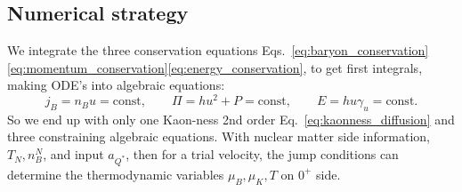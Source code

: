 \documentclass[11pt]{article}
\newcommand{\mgacom}[1]{\textsf{\color[rgb]{0.75,0,0}[\textsuperscript{MGA} #1]}}
\newcommand{\JScom}[1]{\textsf{\color{violet} [\textsuperscript{JS}#1]}}
\begin{document}
\subsection{Numerical strategy}

We integrate the three conservation equations Eqs.~\eqref{eq:baryon_conservation}\eqref{eq:momentum_conservation}\eqref{eq:energy_conservation}, to get first integrals, making ODE's into algebraic equations:
\begin{equation}
j_B=n_B u = \text{const},\qquad \Pi = hu^2 + P=\text{const},\qquad E = hu\gamma_u=\text{const}.
\end{equation}
So we end up with only one Kaon-ness 2nd order  Eq.~\eqref{eq:kaonness_diffusion} and three constraining algebraic equations. 
With nuclear matter side information, $T_N, n_B^N$, and input $a_{Q^*}$, then for a trial velocity, the jump conditions can determine the thermodynamic variables $\mu_B, \mu_K, T$ on $0^+$ side. 
\end{document}
